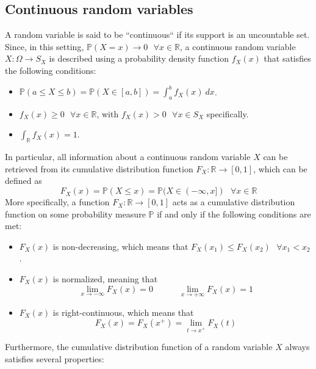 \documentclass{report}
\begin{document}
\subsection{Continuous random variables}
A random variable is said to be ``continuous`` if its support is an uncountable set. \newline
Since, in this setting, $\displaystyle \mathbb{P}(X = x) \to 0 \text{ } \forall x \in \mathbb{R}$, a continuous random variable $\displaystyle X: \Omega \to S_X$ is described using a probability density function $\displaystyle f_X(x)$ that satisfies the following conditions:
\begin{itemize}
    \item $\displaystyle \mathbb{P}(a \leq X \leq b) = \mathbb{P}(X \in [a, b]) = \int_a^b f_X(x) \ dx$.
    \item $\displaystyle f_X(x) \ge 0 \text{ } \forall x \in \mathbb{R}$, with $\displaystyle f_X(x) > 0 \text{ } \forall x \in S_X$ specifically.
    \item $\displaystyle \int_{\mathbb{R}} f_X(x) = 1$.
\end{itemize}
In particular, all information about a continuous random variable $\displaystyle X$ can be retrieved from its cumulative distribution function $\displaystyle F_X: \mathbb{R} \to [0, 1]$, which can be defined as
\[F_X(x) = \mathbb{P}(X \leq x) = \mathbb{P}(X \in (-\infty, x]) \text{ } \forall x \in \mathbb{R}\]
More specifically, a function $\displaystyle F_X: \mathbb{R} \to [0, 1]$ acts as a cumulative distribution function on some probability measure $\displaystyle \mathbb{P}$ if and only if the following conditions are met:
\begin{itemize}
    \item $\displaystyle F_X(x)$ is non-decreasing, which means that $\displaystyle F_X(x_1) \leq F_X(x_2) \text{ } \forall x_1 < x_2$.
    \item $\displaystyle F_X(x)$ is normalized, meaning that
    \[\lim_{x \to -\infty} F_X(x) = 0 \quad\quad\quad \lim_{x \to +\infty} F_X(x) = 1\]
    \item $\displaystyle F_X(x)$ is right-continuous, which means that
    \[F_X(x) = F_X(x^+)= \lim_{t \to x^+} F_X(t)\]
\end{itemize}
Furthermore, the cumulative distribution function of a random variable $\displaystyle X$ always satisfies several properties:
\end{document}
